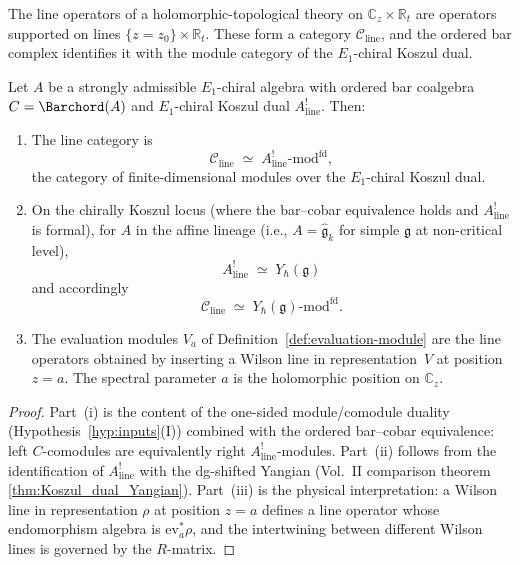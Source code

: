 The line operators of a holomorphic-topological theory on
$\mathbb{C}_z\times\mathbb{R}_t$ are operators supported on
lines $\{z=z_0\}\times\mathbb{R}_t$. These form a
category $\mathcal{C}_{\mathrm{line}}$, and the ordered bar
complex identifies it with the module category of the
$E_1$-chiral Koszul dual.

\begin{theorem}
\label{thm:line-category}
Let $A$ be a strongly admissible $E_1$-chiral algebra
with ordered bar coalgebra $C=\Barchord(A)$ and
$E_1$-chiral Koszul dual $A^!_{\mathrm{line}}$. Then:
\begin{enumerate}[label=(\roman*)]
\item The line category is
\[
\mathcal{C}_{\mathrm{line}}
\;\simeq\;
A^!_{\mathrm{line}}\text{-}\mathrm{mod}^{\mathrm{fd}},
\]
the category of finite-dimensional modules over the
$E_1$-chiral Koszul dual.

\item On the chirally Koszul locus \textup{(}where the bar--cobar
equivalence holds and $A^!_{\mathrm{line}}$ is formal\textup{)},
for $A$ in the affine lineage
\textup{(}i.e., $A=\hat{\mathfrak{g}}_k$
for simple $\mathfrak{g}$ at non-critical level\textup{)},
\[
A^!_{\mathrm{line}}
\;\simeq\;
Y_\hbar(\mathfrak{g})
\]
and accordingly
\[
\mathcal{C}_{\mathrm{line}}
\;\simeq\;
Y_\hbar(\mathfrak{g})\text{-}\mathrm{mod}^{\mathrm{fd}}.
\]

\item The evaluation modules $V_a$ of
Definition~\textup{\ref{def:evaluation-module}} are the line
operators obtained by inserting a Wilson line in
representation~$V$ at position $z=a$. The spectral
parameter $a$ is the holomorphic position on $\mathbb{C}_z$.
\end{enumerate}
\end{theorem}

\begin{proof}
Part~(i) is the content of the one-sided module/comodule
duality (Hypothesis~\ref{hyp:inputs}(I)) combined with
the ordered bar--cobar equivalence: left $C$-comodules are
equivalently right $A^!_{\mathrm{line}}$-modules.
Part~(ii) follows from the identification of
$A^!_{\mathrm{line}}$ with the dg-shifted Yangian
\textup{(}Vol.~II comparison theorem
\ref*{thm:Koszul_dual_Yangian}\textup{)}.
Part~(iii) is the physical interpretation: a Wilson line in
representation $\rho$ at position $z=a$ defines a line
operator whose endomorphism algebra is
$\mathrm{ev}_a^*\rho$, and the intertwining between
different Wilson lines is governed by the $R$-matrix.
\end{proof}

